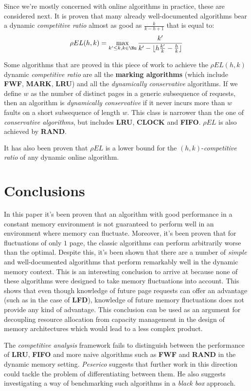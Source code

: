 Since we're mostly concerned with online algorithms in practice, these are
considered next. It is proven that many already well-documented algorithms bear
a dynamic \emph{competitive ratio} almost as good as $\frac{k}{k
- h + 1}$ that is equal to: $$ \rho EL(h, k)=\max_{k' \leq k, k \in \Nu}
\frac{k'}{k' - \lfloor h \frac{k'}{k} - \frac{h}{k} \rfloor} $$

Some algorithms that are proved in this piece of work to achieve the $\rho
EL(h, k)$ dynamic \emph{competitive ratio} are all the \textbf{marking
algorithms} (which include \textbf{FWF}, \textbf{MARK}, \textbf{LRU}) and all
the \emph{dynamically conservative} algorithms. If we define $w$ as the number
of distinct pages in a generic subsequence of requests, then an algorithm is
\emph{dynamically conservative} if it never incurs more than $w$ faults on a
short subsequence of length $w$. This class is narrower than the one of
\emph{conservative algorithms}, but includes \textbf{LRU}, \textbf{CLOCK} and
\textbf{FIFO}. $\rho EL$ is also achieved by \textbf{RAND}.

It has also been proven that $\rho EL$ is a lower bound for the $(h,
k)$-\emph{competitive ratio} of any dynamic online algorithm.


\section*{Conclusions \cite{peserico2013paging2223}}

In this paper it's been proven that an algorithm with good performance in a
constant memory environment is not guaranteed to perform well in an environment
where memory can fluctuate. Moreover, it's been proven that for fluctuations of
only $1$ page, the classic algorithms can perform arbitrarily worse than the
optimal. Despite this, it's been shown that there are a number of \emph{simple}
and well-documented algorithms that perform remarkably well in the dynamic
memory context. This is an interesting conclusion to arrive at because none of
these algorithms were designed to take memory fluctuations into account. This
shows that even though knowledge of future page requests can offer an advantage
(such as in the case of \textbf{LFD}), knowledge of future memory fluctuations
does not provide any kind of advantage. This conclusion can be used as an
argument for decoupling resource allocation from capacity management in the
design of memory architectures which would lead to a less complex product.

 The \emph{competitive analysis} framework fails to distinguish between the
 performance of \textbf{LRU}, \textbf{FIFO} and more naive algorithms such as
 \textbf{FWF} and \textbf{RAND} in the dynamic memory setting. \emph{Peserico}
 suggests that further work in this direction could tackle the problem of
 differentiating between them. He also suggests investigating a way of
 benchmarking such algorithms in a \emph{black box} approach.


